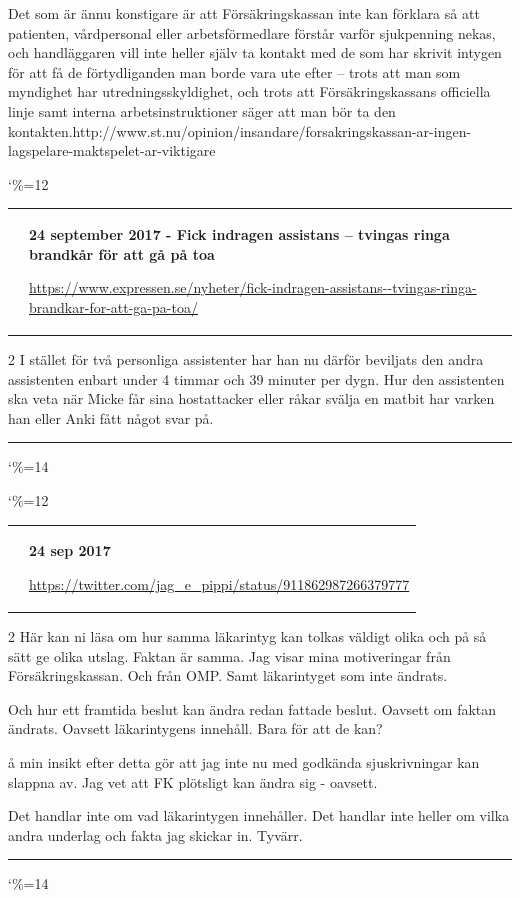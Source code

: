 \documentclass[a4paper]{article}
\makeatletter
\newcommand{\entry}{
\catcode`\%=12
\@entry}
\newcommand{\@entry}[3]{
\bigskip
\begin{tabular*}{\textwidth}{l m{\textwidth-4cm}}
\qrcode{#3} & \textbf{#1}

\medskip

\url{#3}

\end{tabular*}

\medskip


\begin{multicols}{2}
#2
\end{multicols}

\medskip
\hrule

\catcode`\%=14
}
\makeatother
\begin{document}
{{Det som är ännu konstigare är att Försäkringskassan inte kan förklara så att patienten, vårdpersonal eller arbetsförmedlare förstår varför sjukpenning nekas, och handläggaren vill inte heller själv ta kontakt med de som har skrivit intygen för att få de förtydliganden man borde vara ute efter – trots att man som myndighet har utredningsskyldighet, och trots att Försäkringskassans officiella linje samt interna arbetsinstruktioner säger att man bör ta den kontakten.}{http://www.st.nu/opinion/insandare/forsakringskassan-ar-ingen-lagspelare-maktspelet-ar-viktigare}

\entry{24 september 2017 - Fick indragen assistans – tvingas ringa brandkår för att gå på toa}{I stället för två personliga assistenter har han nu därför beviljats den andra assistenten enbart under 4 timmar och 39 minuter per dygn. Hur den assistenten ska veta när Micke får sina hostattacker eller råkar svälja en matbit har varken han eller Anki fått något svar på.}{https://www.expressen.se/nyheter/fick-indragen-assistans--tvingas-ringa-brandkar-for-att-ga-pa-toa/}

\entry{24 sep 2017}{Här kan ni läsa om hur samma läkarintyg kan tolkas väldigt olika och på så sätt ge olika utslag. Faktan är samma.
Jag visar mina motiveringar från Försäkringskassan.
Och från OMP.
Samt läkarintyget som inte ändrats.

Och hur ett framtida beslut kan ändra redan fattade beslut.
Oavsett om faktan ändrats.
Oavsett läkarintygens innehåll.
Bara för att de kan?

å min insikt efter detta gör att jag inte nu med godkända sjuskrivningar kan slappna av.
Jag vet att FK plötsligt kan ändra sig - oavsett.

Det handlar inte om vad läkarintygen innehåller.
Det handlar inte heller om vilka andra underlag och fakta jag skickar in.
Tyvärr.
}{https://twitter.com/jag_e_pippi/status/911862987266379777}

}
\end{document}
